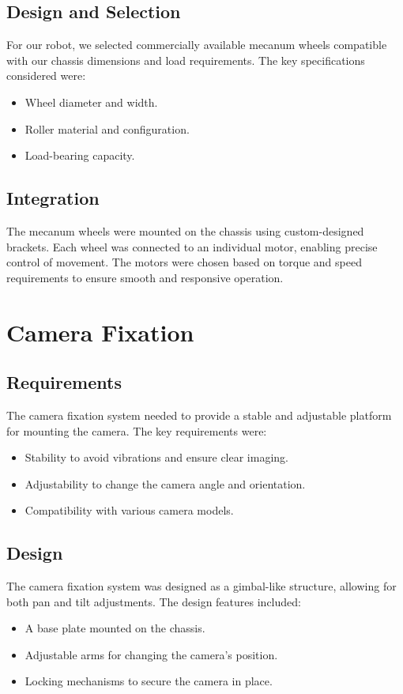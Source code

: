 \newpage
\subsection{Design and Selection}
For our robot, we selected commercially available mecanum wheels compatible with our chassis
dimensions and load requirements. The key specifications considered were:
\begin{itemize}
	\item Wheel diameter and width.
	\item Roller material and configuration.
	\item  Load-bearing capacity.
\end{itemize}

\subsection{Integration}
The mecanum wheels were mounted on the chassis using custom-designed brackets. Each wheel
was connected to an individual motor, enabling precise control of movement. The motors were
chosen based on torque and speed requirements to ensure smooth and responsive operation.

\section{Camera Fixation}
\subsection{Requirements}
The camera fixation system needed to provide a stable and adjustable platform for mounting the
camera. The key requirements were:
\begin{itemize}
	\item Stability to avoid vibrations and ensure clear imaging.
	\item Adjustability to change the camera angle and orientation.
	\item Compatibility with various camera models.
\end{itemize}


\subsection{Design}
The camera fixation system was designed as a gimbal-like structure, allowing for both pan and tilt
adjustments. The design features included:
\begin{itemize}
	\item A base plate mounted on the chassis.
	\item Adjustable arms for changing the camera’s position.
	\item Locking mechanisms to secure the camera in place.
\end{itemize}

